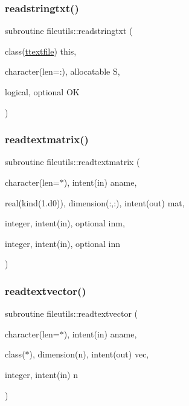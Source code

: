 \subsubsection{\texorpdfstring{readstringtxt()}{readstringtxt()}}
{\footnotesize\ttfamily subroutine fileutils\+::readstringtxt (\begin{DoxyParamCaption}\item[{class(\mbox{\hyperlink{structfileutils_1_1ttextfile}{ttextfile}})}]{this,  }\item[{character(len=\+:), allocatable}]{S,  }\item[{logical, optional}]{OK }\end{DoxyParamCaption})\hspace{0.3cm}{\ttfamily [private]}}

\mbox{\label{namespacefileutils_a34de05bb4524587b63bb0eb4bebd6e4a}} 
\subsubsection{\texorpdfstring{readtextmatrix()}{readtextmatrix()}}
{\footnotesize\ttfamily subroutine fileutils\+::readtextmatrix (\begin{DoxyParamCaption}\item[{character(len=$\ast$), intent(in)}]{aname,  }\item[{real(kind(1.d0)), dimension(\+:,\+:), intent(out)}]{mat,  }\item[{integer, intent(in), optional}]{inm,  }\item[{integer, intent(in), optional}]{inn }\end{DoxyParamCaption})\hspace{0.3cm}{\ttfamily [private]}}

\mbox{\label{namespacefileutils_ab6b6b5446754f42206e21485cb75e539}} 
\subsubsection{\texorpdfstring{readtextvector()}{readtextvector()}}
{\footnotesize\ttfamily subroutine fileutils\+::readtextvector (\begin{DoxyParamCaption}\item[{character(len=$\ast$), intent(in)}]{aname,  }\item[{class($\ast$), dimension(n), intent(out)}]{vec,  }\item[{integer, intent(in)}]{n }\end{DoxyParamCaption})\hspace{0.3cm}{\ttfamily [private]}}

